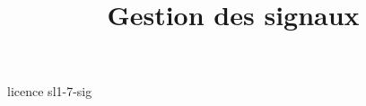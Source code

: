 \documentclass {beamer}
\title {Gestion des signaux}
\begin{document}
 {licence}
 {sl1-7-sig}
\end{document}
